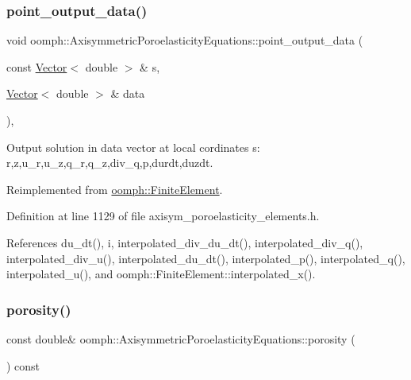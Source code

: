 \subsubsection{\texorpdfstring{point\+\_\+output\+\_\+data()}{point\_output\_data()}}
{\footnotesize\ttfamily void oomph\+::\+Axisymmetric\+Poroelasticity\+Equations\+::point\+\_\+output\+\_\+data (\begin{DoxyParamCaption}\item[{const \hyperlink{classoomph_1_1Vector}{Vector}$<$ double $>$ \&}]{s,  }\item[{\hyperlink{classoomph_1_1Vector}{Vector}$<$ double $>$ \&}]{data }\end{DoxyParamCaption})\hspace{0.3cm}{\ttfamily [inline]}, {\ttfamily [virtual]}}



Output solution in data vector at local cordinates s\+: r,z,u\+\_\+r,u\+\_\+z,q\+\_\+r,q\+\_\+z,div\+\_\+q,p,durdt,duzdt. 



Reimplemented from \hyperlink{classoomph_1_1FiniteElement_a8bf3f75b55d4e67b644df3e22c192596}{oomph\+::\+Finite\+Element}.



Definition at line 1129 of file axisym\+\_\+poroelasticity\+\_\+elements.\+h.



References du\+\_\+dt(), i, interpolated\+\_\+div\+\_\+du\+\_\+dt(), interpolated\+\_\+div\+\_\+q(), interpolated\+\_\+div\+\_\+u(), interpolated\+\_\+du\+\_\+dt(), interpolated\+\_\+p(), interpolated\+\_\+q(), interpolated\+\_\+u(), and oomph\+::\+Finite\+Element\+::interpolated\+\_\+x().

\mbox{\label{classoomph_1_1AxisymmetricPoroelasticityEquations_a2c9be6018e209653e76552a5d3a83f78}} 
\subsubsection{\texorpdfstring{porosity()}{porosity()}}
{\footnotesize\ttfamily const double\& oomph\+::\+Axisymmetric\+Poroelasticity\+Equations\+::porosity (\begin{DoxyParamCaption}{ }\end{DoxyParamCaption}) const\hspace{0.3cm}{\ttfamily [inline]}}



